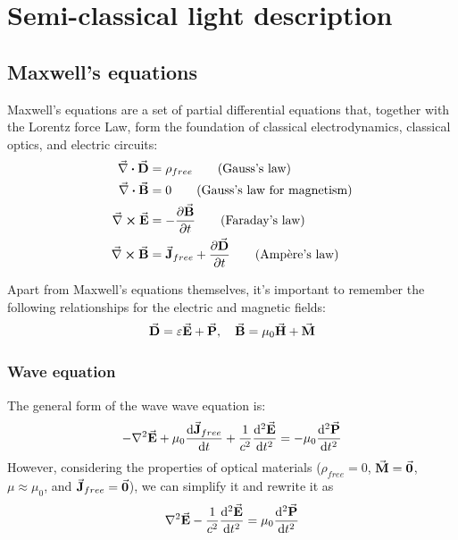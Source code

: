 \section{Semi-classical light description}
\subsection{Maxwell's equations}
Maxwell's equations are a set of partial differential equations that, together with the Lorentz force Law, form the foundation of classical electrodynamics, classical optics, and electric circuits:
\begin{align}
	\div{D} &= \rho_{free} \tag{Gauss's law} \\
	\div{B} &= 0 \tag{Gauss's law for magnetism} \\
	\curl{E} &= - \pdv{\va{B}}{t} \tag{Faraday's law} \\
	\curl{B} &= \va{J}_{free} + \pdv{\va{D}}{t} \tag{Ampère's law}
\end{align}

Apart from Maxwell's equations themselves, it's important to remember the following relationships for the electric and magnetic fields:
\begin{align*}
	\va{D} = \varepsilon \va{E} + \va{P} \qc \va{B} = \mu_{0} \va{H} + \va{M}
\end{align*}

\subsubsection*{Wave equation}
The general form of the wave wave equation is:
\begin{align*}
	- \laplacian{\va{E}} + \mu_{0} \dv{\va{J}_{free}}{t} + \frac{1}{c^{2}} \dv[2]{\va{E}}{t} = - \mu_{0} \dv[2]{\va{P}}{t}
\end{align*}
However, considering the properties of optical materials ($\rho_{free} = 0$, $\va{M} = \va{0}$, $\mu \approx \mu_{0}$, and $\va{J}_{free} = \va{0}$), we can simplify it and rewrite it as
\begin{align}
	\laplacian{\va{E}} - \frac{1}{c^{2}} \dv[2]{\va{E}}{t} = \mu_{0} \dv[2]{\va{P}}{t}
\end{align}

